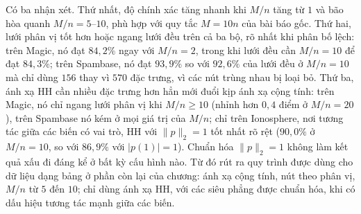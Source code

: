 Có ba nhận xét. Thứ nhất, độ chính xác tăng nhanh khi $M/n$ tăng từ $1$ và bão hòa quanh $M/n=5$--$10$, phù hợp với quy tắc $M=10n$ của bài báo gốc. Thứ hai, lưới phân vị tốt hơn hoặc ngang lưới đều trên cả ba bộ, rõ nhất khi phân bố lệch: trên Magic, nó đạt $84{,}2\%$ ngay với $M/n=2$, trong khi lưới đều cần $M/n=10$ để đạt $84{,}3\%$; trên Spambase, nó đạt $93{,}9\%$ so với $92{,}6\%$ của lưới đều ở $M/n=10$ mà chỉ dùng $156$ thay vì $570$ đặc trưng, vì các nút trùng nhau bị loại bỏ. Thứ ba, ánh xạ HH cần nhiều đặc trưng hơn hẳn mới đuổi kịp ánh xạ cộng tính: trên Magic, nó chỉ ngang lưới phân vị khi $M/n\ge10$ (nhỉnh hơn $0{,}4$ điểm ở $M/n=20$), trên Spambase nó kém ở mọi giá trị của $M/n$; chỉ trên Ionosphere, nơi tương tác giữa các biến có vai trò, HH với $\|p\|_2=1$ tốt nhất rõ rệt ($90{,}0\%$ ở $M/n=10$, so với $86{,}9\%$ với $|p(1)|=1$). Chuẩn hóa $\|p\|_2=1$ không làm kết quả xấu đi đáng kể ở bất kỳ cấu hình nào. Từ đó rút ra quy trình được dùng cho dữ liệu dạng bảng ở phần còn lại của chương: ánh xạ cộng tính, nút theo phân vị, $M/n$ từ $5$ đến $10$; chỉ dùng ánh xạ HH, với các siêu phẳng được chuẩn hóa, khi có dấu hiệu tương tác mạnh giữa các biến.

